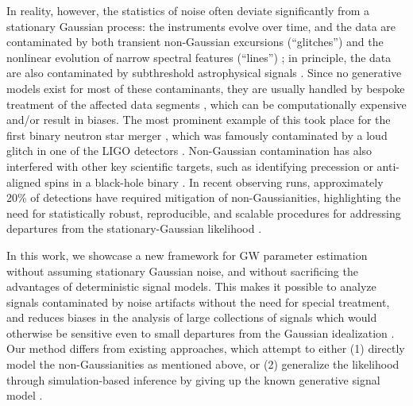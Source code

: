 \documentclass[twocolumn]{aastex631}
\begin{document}
In reality, however, the statistics of noise often deviate significantly from a stationary Gaussian process: the instruments evolve over time, and the data are contaminated by both transient non-Gaussian excursions (``glitches'') and the nonlinear evolution of narrow spectral features (``lines'') \citep{LIGOScientific:2016gtq,Abbott:2016xvh,aLIGO:2020wna}; in principle, the data are also contaminated by subthreshold astrophysical signals \citep{LIGOScientific:2021usb}.
Since no generative models exist for most of these contaminants, they are usually handled by bespoke treatment of the affected data segments \citep{Cornish:2014kda,Cornish:2020dwh,Davis:2018yrz,Chatziioannou:2021ezd,Davis:2022ird,Hourihane:2022doe,Udall:2022vkv,Ashton:2022ztk}, which can be computationally expensive and/or result in biases.
The most prominent example of this took place for the first binary neutron star merger \citep{LIGOScientific:2017vwq}, which was famously contaminated by a loud glitch in one of the LIGO detectors \citep{Pankow:2018qpo}. Non-Gaussian contamination has also interfered with other key scientific targets, such as identifying precession or anti-aligned spins in a black-hole binary \citep{Hannam:2021pit,Payne:2022spz,Macas:2023wiw,Udall:2024ovp}. In recent observing runs, approximately 20\% of detections have required mitigation of non-Gaussianities, highlighting the need for statistically robust, reproducible, and scalable procedures for addressing departures from the stationary-Gaussian likelihood \citep{Davis:2022ird}.

In this work, we showcase a new framework for GW parameter estimation without assuming stationary Gaussian noise, and without sacrificing the advantages of deterministic signal models.
This makes it possible to analyze signals contaminated by noise artifacts without the need for special treatment, and reduces biases in the analysis of large collections of signals which would otherwise be sensitive even to small departures from the Gaussian idealization \citep{Heinzel:2023vkq}. Our method differs from existing approaches, which attempt to either (1) directly model the non-Gaussianities as mentioned above, or (2) generalize the likelihood through simulation-based inference by giving up the known generative signal model \citep{2021PhRvL.127x1103D, 2024PhRvD.109f4056L,Dax:2024mcn,Xiong:2024gpx,Raymond:2024xzj}.
\end{document}
